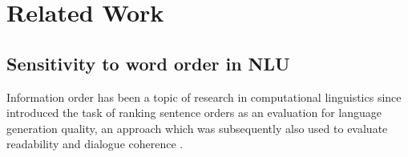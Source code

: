 \documentclass[letterpaper, 12pt]{report}
\begin{document}




% 







\section{Related Work}
\label{sec:mlm_related_work}


\subsection{Sensitivity to word order in NLU}

Information order has been a topic of research in computational linguistics since \cite{barzilay-lee-2004-catching} introduced the task of ranking sentence orders
as an evaluation for language generation quality, an approach which was subsequently also used to evaluate readability and dialogue coherence \citep{barzilay-lapata-2008-modeling, laban-etal-2021-transformer}.
\end{document}
